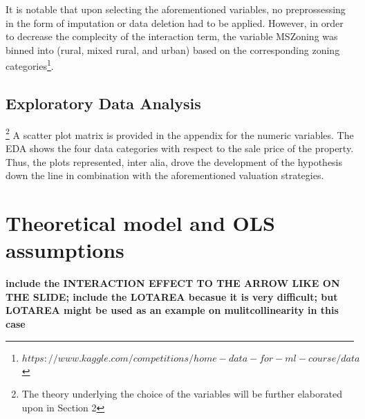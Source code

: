\documentclass{article}
\begin{document}
It is notable that upon selecting the aforementioned variables, no preprossessing in the form of imputation or data deletion had to be applied. However, in order to decrease the complecity of the interaction term, the variable MSZoning was binned into (rural, mixed rural, and urban) based on the corresponding zoning categories\footnote{$https://www.kaggle.com/competitions/home-data-for-ml-course/data$}.


\subsection{Exploratory Data Analysis}\footnote{The theory underlying the choice of the variables will be further elaborated upon in Section 2}
A scatter plot matrix is provided in the appendix for the numeric variables. The EDA shows the four data categories with respect to the sale price of the property. Thus, the plots represented, inter alia, drove the development of the hypothesis down the line in combination with the aforementioned valuation strategies. 

\section{Theoretical model and OLS assumptions}




\begin{center}
\end{center}

\textbf{include the INTERACTION EFFECT TO THE ARROW LIKE ON THE SLIDE; include the LOTAREA becasue it is very difficult; but LOTAREA might be used as an example on mulitcollinearity in this case}
\end{document}
